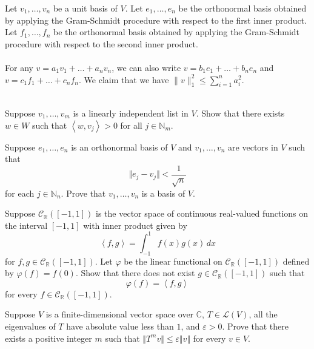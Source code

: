\documentclass[12pt, letterpaper]{hmcpset}
\begin{document}
\begin{solution}
	Let $v_1, \dots, v_n$ be a unit basis of $V$. Let $e_1, \dots, e_n$ be the orthonormal basis obtained by applying the Gram-Schmidt procedure with respect to the first inner product. Let  $f_1, \dots, f_n$ be the orthonormal basis obtained by applying the Gram-Schmidt procedure with respect to the second inner product. \\\\
	For any $v = a_{1} v_{1} + \dots + a_n v_{n}$, we can also write $v = b_{1} e_{1} + \dots + b_{n} e_{n}$ and $v = c_{1} f_{1} + \dots + c_{n} f_{n}$. We claim that we have $\lVert v \rVert_{1}^{2} \le \sum_{i = 1}^{n} a_{i}^{2}$. \\\\
\end{solution}

\pagebreak

\begin{problem}[13.]
	Suppose $v_1, \dots, v_m$ is a linearly independent list in $V$. Show that there exists $w \in W$ such that $\left < w, v_j \right > > 0$ for all $j \in \mathbb N_m$.
\end{problem}

\pagebreak

\begin{problem}[14.]
	Suppose $e_1, \dots, e_n$ is an orthonormal basis of $V$ and $v_1, \dots, v_n$ are vectors in $V$ such that
	\[
		\Vert e_j - v_j \Vert < \frac{1}{\sqrt n}
	\]
	for each $j \in \mathbb N_n$. Prove that $v_1, \dots, v_n$ is a basis of $V$.
\end{problem}

\pagebreak

\begin{problem}[15.]
	Suppose $\mathcal C_{\mathbb R}([-1, 1])$ is the vector space of continuous real-valued functions on the interval $[-1, 1]$ with inner product given by
	\[
		\left < f, g \right > = \int_{-1}^1 f(x) g(x) \, dx
	\]
	for $f, g \in \mathcal C_{\mathbb R}([-1, 1])$. Let $\varphi$ be the linear functional on $\mathcal C_{\mathbb R}([-1, 1])$ defined by $\varphi(f) = f(0)$. Show that there does not exist $g \in \mathcal C_{\mathbb R}([-1, 1])$ such that
	\[
		\varphi(f) = \left < f, g \right >
	\]
	for every $f \in \mathcal C_{\mathbb R}([-1, 1])$.
\end{problem}

\pagebreak

\begin{problem}[16.]
	Suppose $V$ is a finite-dimensional vector space over $\mathbb C$, $T \in \mathcal L(V)$, all the eigenvalues of $T$ have absolute value less than $1$, and $\varepsilon > 0$. Prove that there exists a positive integer $m$ such that $\Vert T^m v \Vert \le \varepsilon \Vert v \Vert$ for every $v \in V$.
\end{problem}
\end{document}
